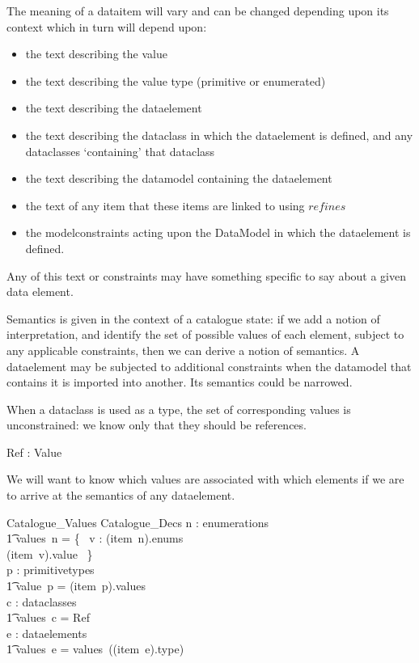 \documentclass[a4paper,twoside]{article}
\def\refines{\mathrel{refines}}
\begin{document}
\begin{zed}
	[Interpretation]
\end{zed}

The meaning of a dataitem will vary and can be changed depending upon its context which in turn will depend upon:
\begin{itemize}
	\item the text describing the value
	\item the text describing the value type (primitive or enumerated)
	\item the text describing the dataelement
	\item the text describing the dataclass in which the dataelement is defined,
	and any dataclasses `containing' that dataclass
	\item the text describing the datamodel containing the dataelement
	\item the text of any item that these items are linked to using $\refines$ 
	\item the modelconstraints acting upon the DataModel in which the dataelement is defined.
\end{itemize}
Any of this text or constraints may have something specific to say about a given data element.  

Semantics is given in the context of a catalogue state: if we add a notion of interpretation, and identify the set of possible values of each element, subject to any applicable constraints, then we can derive a notion of semantics. A dataelement may be subjected to additional constraints when the datamodel that contains it is imported into another.   Its semantics could be narrowed.  

When a dataclass is used as a type, the set of corresponding values is unconstrained: we know only that they should be references.   
\begin{axdef}
	Ref : \power Value 
\end{axdef}

We will want to know which values are associated with which elements if we are to arrive at the semantics of any dataelement.

\begin{schema}{Catalogue\_Values}
	Catalogue\_Decs
	\where
	\forall n : enumerations \spot {} \\ \t1 
	values~n = \{~ v : (item~n).enums \spot\\ (item~v).value ~\} \\
	\forall p : primitivetypes \spot {} \\ \t1 
	value~p = (item~p).values \\
	\forall c : dataclasses \spot {} \\ \t1 
	values~c = Ref \\
	\forall e : dataelements \spot {} \\ \t1 
	values~e = values~((item~e).type) 
\end{schema}
\end{document}

